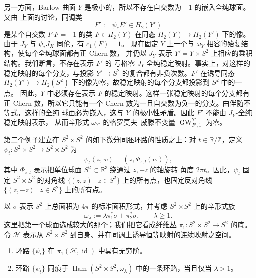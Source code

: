 \begin{example}[非形变等价的六维流形]
另一方面，Barlow 曲面 $Y$ 是极小的，所以不存在自交数为 $-1$ 的嵌入全纯球面。又由
上面的讨论，同调类
\[
  F':=\psi_*E'\in H_2(Y')
\]
是某个自交数 $F\mathbin{\boldsymbol\cdot}F=-1$ 的类 $F\in H_2(Y)$ 在同态
$H_2(Y)\to H_2(Y')$ 下的像。由于 $J_Y$ 与 $\psi_*J_X$ 同伦，有 $c_1(F)=1$。
现在固定 $Y$ 上一个与 $\omega_Y$ 相容的殆复结构，使每个全纯球面都有正 Chern 数，
并仍以 $J_Y$ 表示 $Y'=Y\times S^2$ 上相应的乘积结构。我们断言，不存在表示 $F'$ 的
亏格零 $J_Y$-全纯稳定映射。事实上，对这样的稳定映射的每个分支，与投影
$Y'\to S^2$ 的复合都有非负次数。$F'$ 在诱导同态
$H_2(Y')\to H_2(S^2)$ 下的像为零，故稳定映射的每个分支都投影到 $S^2$ 中的一点。
因此，$Y$ 中必须存在表示 $F$ 的稳定映射。这样一张稳定映射的每个分支都有正 Chern
数，所以它只能有一个 Chern 数为一且自交数为负一的分支。由伴随不等式，这样的全纯
球面必为嵌入，这与 $Y$ 的极小性矛盾。因此 $F'$ 不能由 $J_Y$-全纯稳定映射表示，
从而辛形式 $\omega_{Y'}$ 的格罗莫夫--威滕不变量
$\operatorname{GW}_{F',1}^{Y'}$ 为零。
\end{example}

第二个例子建立在 $S^2\times S^2$ 的如下微分同胚环路的性质之上：对
$t\in\mathbb R/\mathbb Z$，定义
$\psi_t:S^2\times S^2\to S^2\times S^2$ 为
\begin{equation}\label{eq:9-7-1}
  \psi_t(z,w)=(z,\Phi_{z,t}(w)),
\end{equation}
其中 $\Phi_{z,t}$ 表示把单位球面 $S^2\subset\mathbb R^3$ 绕通过 $z,-z$ 的轴旋转
角度 $2\pi t$。因此，$\psi_t$ 固定 $S^2\times S^2$ 的对角线
$\{(z,z)\mid z\in S^2\}$ 上的所有点，也固定反对角线
$\{(z,-z)\mid z\in S^2\}$ 上的所有点。

以 $\sigma$ 表示 $S^2$ 上总面积为 $4\pi$ 的标准面积形式，并考虑
$S^2\times S^2$ 上的辛形式族
\[
  \omega_\lambda:=\lambda\pi_1^*\sigma+\pi_2^*\sigma,
  \qquad \lambda\ge1.
\]
这里把第一个球面选成较大的那个；我们把它看成纤维丛
$\pi_1:S^2\times S^2\to S^2$ 的底。令 $\mathcal H$ 表示从
$S^2\times S^2$ 到自身、并在同调上诱导恒等映射的连续映射之空间。

\begin{proposition}\label{prop:9-7-2}
\begin{enumerate}[label=\textnormal{(\roman*)}]
\item 环路 $\{\psi_t\}$ 在 $\pi_1(\mathcal H,\operatorname{id})$ 中具有无穷阶。
\item 环路 $\{\psi_t\}$ 同痕于
$\operatorname{Ham}(S^2\times S^2,\omega_\lambda)$ 中的一条环路，当且仅当
$\lambda>1$。
\end{enumerate}
\end{proposition}

